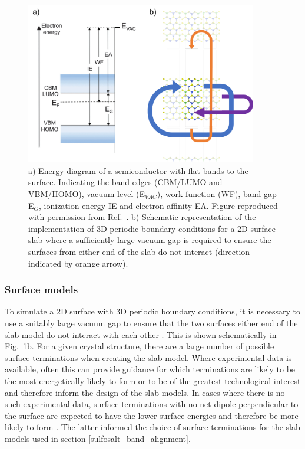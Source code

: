 \documentclass[11pt, twoside]{report}
\begin{document}
\begin{figure}[h!]
  \centering
    \includegraphics[width=0.9\textwidth]{figures/slab_figs.png}
    \caption[a) Energy diagram of a semiconductor with flat bands to the surface. Indicating the band edges (CBM/LUMO and VBM/HOMO), vacuum level (E$_{VAC}$), work function (WF), band gap E$_G$, ionization energy IE and electron affinity EA. b) Schematic representation of the implementation of 3D periodic boundary conditions for a 2D surface slab where a sufficiently large vacuum gap is required to ensure the surfaces from either end of the slab do not interact (direction indicated by orange arrow).]{a) Energy diagram of a semiconductor with flat bands to the surface. Indicating the band edges (CBM/LUMO and VBM/HOMO), vacuum level (E$_{VAC}$), work function (WF), band gap E$_G$, ionization energy IE and electron affinity EA. Figure reproduced with permission from Ref.~. b) Schematic representation of the implementation of 3D periodic boundary conditions for a 2D surface slab where a sufficiently large vacuum gap is required to ensure the surfaces from either end of the slab do not interact (direction indicated by orange arrow).}
  \label{slabs}
\end{figure}

\subsubsection{Surface models}
To simulate a 2D surface with 3D periodic boundary conditions, it is necessary to use a suitably large vacuum gap to ensure that the two surfaces either end of the slab model do not interact with each other \cite{Prasad_ch6}. This is shown schematically in Fig.~\ref{slabs}b.
For a given crystal structure, there are a large number of possible surface terminations when creating the slab model. Where experimental data is available, often this can provide guidance for which terminations are likely to be the most energetically likely to form or to be of the greatest technological interest and therefore inform the design of the slab models. In cases where there is no such experimental data, surface terminations with no net dipole perpendicular to the surface are expected to have the lower surface energies and therefore be more likely to form \cite{Tasker}. The latter informed the choice of surface terminations for the slab models used in section \ref{sulfosalt_band_alignment}.
\end{document}
